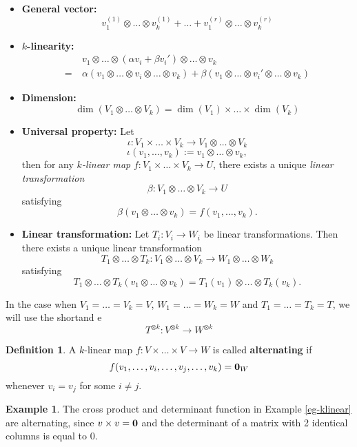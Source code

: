 \documentclass[11pt,openany]{book}
\theoremstyle{plain}
\theoremstyle{definition}
\newtheorem{definition}[definition]{Definition}
\newtheorem{example}[example]{Example}
\theoremstyle{remark}
\begin{document}
\begin{itemize}
    \item {\bf General vector:}
    $$v_1^{(1)} \otimes \dots \otimes v_k^{(1)} + \dots + v_1^{(r)} \otimes \dots \otimes v_k^{(r)}$$
    \item {\bf $k$-linearity:}
    \begin{align*}
    &v_1 \otimes \dots \otimes (\alpha v_i + \beta v_i') \otimes \dots \otimes v_k\\ 
    =\ &\alpha(v_1 \otimes \dots \otimes v_i \otimes \dots \otimes v_k) + \beta(v_1 \otimes \dots \otimes v_i' \otimes \dots \otimes v_k)\end{align*}
    \item {\bf Dimension:}
    $$\dim(V_1 \otimes \dots \otimes V_k) = \dim(V_1) \times \dots \times \dim(V_k)$$
    \item {\bf Universal property:} Let 
    $$\iota: V_1 \times \dots \times V_k \to V_1 \otimes \dots \otimes V_k$$
    $$\iota(v_1, \dots, v_k) := v_1 \otimes \dots \otimes v_k,$$
    then for any {\it $k$-linear map} $f: V_1 \times \dots \times V_k \to U$, there exists a unique {\it linear transformation} 
    $$\beta: V_1 \otimes \dots \otimes V_k \to U$$
    satisfying
    $$\beta(v_1 \otimes \dots \otimes v_k) = f(v_1, \dots, v_k).$$
    \item {\bf Linear transformation:} Let $T_i: V_i \to W_i$ be linear transformations. Then there exists a unique linear transformation
    $$T_1 \otimes \dots \otimes T_k: V_1 \otimes \dots \otimes V_k \to W_1 \otimes \dots \otimes W_k$$
    satisfying
    $$T_1 \otimes \dots \otimes T_k(v_1 \otimes \dots \otimes v_k) = T_1(v_1) \otimes \dots \otimes T_k(v_k).$$
\end{itemize}
In the case when $V_1 = \dots = V_k = V$, $W_1 = \dots = W_k = W$ and $T_1 = \dots = T_k = T$, we will use the shortand e
$$T^{\otimes k} : V^{\otimes k}  \to W^{\otimes k}$$

\begin{definition} A $k$-linear map $f:V \times \dots \times V \to W$ is called {\bf alternating} if
$$f(v_1, \dots , v_i , \dots , v_j , \dots , v_k) = {\bf 0}_W$$
whenever $v_i = v_j$ for some $i \neq j$.
\end{definition}
\begin{example}
The cross product and determinant function in Example \ref{eg-klinear} are alternating, since $v \times v = {\bf 0}$ and the determinant of a matrix with 2 identical columns is equal to $0$.
\end{example}
\end{document}
